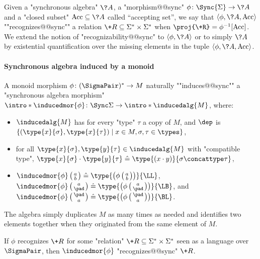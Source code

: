 Given a "synchronous algebra" $\?A$, a "morphism@@sync" $\phi\colon \Sync{\Sigma} \to \?A$
and a "closed subset" $\Acc \subseteq \?A$ called ``accepting set'',
we say that $\langle \phi, \?A, \Acc \rangle$
\AP""recognizes@@sync"" a relation $\+R \subseteq \Sigma^* \times \Sigma^*$
when $\proj{\+R} = \phi^{-1}[\Acc]$.
We extend the notion of "recognizability@@sync" to $\langle \phi, \?A\rangle$
or to simply $\?A$ by existential quantification over the missing elements in the tuple $\langle \phi, \?A, \Acc \rangle$.

\paragraph*{Synchronous algebra induced by a monoid}
A monoid morphism $\phi\colon (\SigmaPair)^* \to M$
naturally ""induces@@sync"" a "synchronous algebra morphism"
\AP$\intro*\inducedmor{\phi} \colon \Sync\Sigma \to \intro*\inducedalg{M}$,
where:
\begin{itemize}
	\item $\inducedalg{M}$ has for every "type" $\tau$ a copy of $M$,
	and $\dep$ is $\{(\type{x}{\sigma}, \type{x}{\tau}) \mid x \in M, \sigma, \tau \in \types\}$,
	\item for all $\type{x}{\sigma}, \type{y}{\tau} \in \inducedalg{M}$
	with "compatible type", $\type{x}{\sigma} \cdot \type{y}{\tau} \defeq \type{(x\cdot y)}{\sigma\concattype\tau}$,
	\item $\inducedmor{\phi}\pair{a}{b} \defeq \type{\bigl(\phi\pair{a}{b}\bigr)}{\LL}$,
		$\inducedmor{\phi}\pair{a}{\pad} \defeq \type{\bigl(\phi\pair{a}{\pad}\bigr)}{\LB}$,
		and $\inducedmor{\phi}\pair{\pad}{a} \defeq \type{\bigl(\phi\pair{\pad}{a}\bigr)}{\BL}$.
\end{itemize}
The algebra simply duplicates $M$ as many times as needed and identifies
two elements together when they originated from the same element of $M$.
\begin{fact}
	\label{fact:induced-morphism}
	If $\phi$ recognizes $\+R$ for some "relation" $\+R \subseteq \Sigma^* \times \Sigma^*$ seen as a language over $\SigmaPair$, then $\inducedmor{\phi}$ "recognizes@@sync" $\+R$.
\end{fact}

